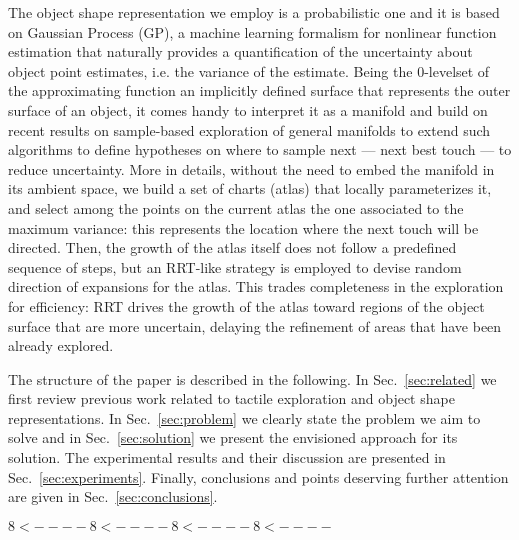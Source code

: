 The object shape representation we employ is a probabilistic one and it is based on Gaussian Process (GP), a machine learning formalism for nonlinear function estimation that naturally provides a quantification of the uncertainty about object point estimates, i.e. the variance of the estimate. Being the $0$-levelset of the approximating function an implicitly defined surface that represents the outer surface of an object, it comes handy to interpret it as a manifold and build on recent results on sample-based exploration of general manifolds to extend such algorithms to define hypotheses on where to sample next --- next best touch --- to reduce uncertainty. More in details, without the need to embed the manifold in its ambient space, we build a set of charts (atlas) that locally parameterizes it, and select among the points on the current atlas the one associated to the maximum variance: this represents the location where the next touch will be directed. Then, the growth of the atlas itself does not follow a predefined sequence of steps, but an RRT-like strategy is employed to devise random direction of expansions for the atlas. This trades completeness in the exploration for efficiency: RRT drives the growth of the atlas toward  regions of the object surface that are more uncertain, delaying the refinement of areas that have been already explored.

The structure of the paper is described in the following.
In Sec.~\ref{sec:related} we first review previous work related to tactile exploration and object shape representations. In Sec.~\ref{sec:problem} we clearly state the problem we aim to solve and in Sec.~\ref{sec:solution} we present the envisioned approach for its solution. The experimental results and their discussion are presented in Sec.~\ref{sec:experiments}. Finally, conclusions and points deserving further attention are given in Sec.~\ref{sec:conclusions}.

$ 8< ---- 8< ---- 8< ---- 8< ---- $








